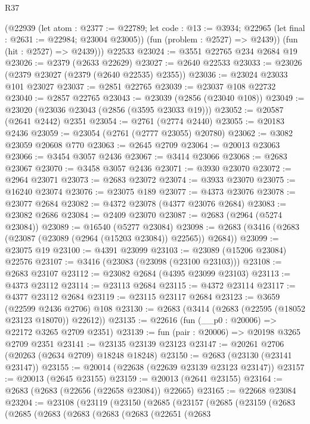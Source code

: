 \begin{lexlean}{R37}
\begin{coremodule}
        (@22939
          (let atom : @2377 := @22789;
          let code : @13 := @3934; @22965 (let final : @2631 := @22984; @23004 @23005))
          (fun (problem : @2527) => @2439))
        (fun (hit : @2527) => @2439)))
    @22533
@23024 := @3551 @22765 @234 @2684 @19
@23026 := @2379 (@2633 @22629)
@23027 := @2640 @22533
@23033 := @23026 (@2379 @23027 (@2379 (@2640 @22535) @2355))
@23036 := @23024 @23033 @101 @23027
@23037 := @2851 @22765
@23039 := @23037 @108 @22732
@23040 := @2857 @22765
@23043 := @23039 (@2856 (@23040 @108))
@23049 := @23020 (@23036 @23043 (@2856 (@3595 @23033 @19)))
@23052 := @20587 (@2641 @2442) @2351
@23054 := @2761 (@2774 @2440)
@23055 := @20183 @2436
@23059 := @23054 (@2761 (@2777 @23055) @20780)
@23062 := @3082 @23059 @20608 @770
@23063 := @2645 @2709
@23064 := @20013 @23063
@23066 := @3454 @3057 @2436
@23067 := @3414 @23066
@23068 := @2683 @23067
@23070 := @3458 @3057 @2436
@23071 := @3930 @23070
@23072 := @2964 @23071
@23073 := @2683 @23072
@23074 := @3933 @23070
@23075 := @16240 @23074
@23076 := @23075 @189
@23077 := @4373 @23076
@23078 := @23077 @2684
@23082 := @4372 @23078 (@4377 @23076 @2684)
@23083 := @23082 @2686
@23084 := @2409 @23070
@23087 := @2683 (@2964 (@5274 @23084))
@23089 := @16540 (@5277 @23084)
@23098 := @2683 (@3416 (@2683 (@23087 (@23089 (@2964 (@15203 @23084)) @22565)) @2684))
@23099 := @23075 @19
@23100 := @4391 @23099
@23103 := @23089 (@15206 @23084) @22576
@23107 := @3416 (@23083 (@23098 (@23100 @23103)))
@23108 := @2683 @23107
@23112 := @23082 @2684 (@4395 @23099 @23103)
@23113 := @4373 @23112
@23114 := @23113 @2684
@23115 := @4372 @23114
@23117 := @4377 @23112 @2684
@23119 := @23115 @23117 @2684
@23123 := @3659 (@22599 @2436 @2706) @108
@23130 := @2683 (@3414 (@2683 (@22595 (@18052 @23123 @18070)) @22612))
@23135 := @22616 (fun (__p0 : @20006) => @22172 @3265 @2709 @2351)
@23139 := fun (pair : @20006) => @20198 @3265 @2709 @2351
@23141 := @23135 @23139 @23123
@23147 := @20261 @2706 (@20263 (@2634 @2709) @18248 @18248)
@23150 := @2683 (@23130 (@23141 @23147))
@23155 := @20014 (@22638 (@22639 @23139 @23123 @23147))
@23157 := @20013 (@2645 @23155)
@23159 := @20013 (@2641 @23155)
@23164 := @2683 (@2683 (@22656 (@22658 @23084)) @22665)
@23165 := @22668 @23084
@23204 := @23108
    (@23119
      (@23150
        (@2685
          (@23157
            (@2685
              (@23159
                (@2683
                  (@2685
                    (@2683
                      (@2683
                        (@2683
                          (@2683
                            (@22651
                              (@2683

\end{coremodule}
\end{lexlean}

